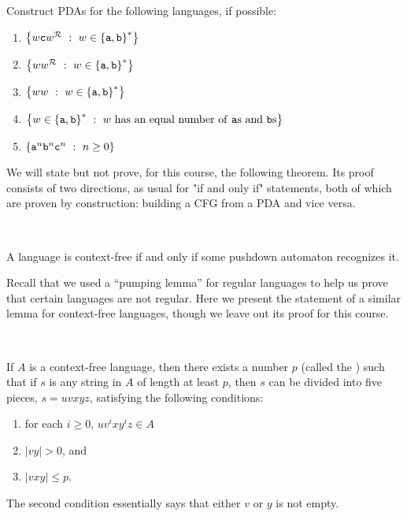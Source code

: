 \documentclass[twoside,letterpaper,openany]{book}
\begin{document}
\begin{exer}
Construct PDAs for the following languages, if possible:
\begin{enumerate}
\item $\left\lbrace w\texttt{c}w^{\mathcal{R}}\ :\  w \in \left\lbrace \texttt{a}, \texttt{b} \right\rbrace^{*}  \right\rbrace$
\item $\left\lbrace ww^{\mathcal{R}}\ :\  w \in \left\lbrace \texttt{a}, \texttt{b} \right\rbrace^{*}  \right\rbrace$
\item $\left\lbrace w{w}\ :\  w \in \left\lbrace \texttt{a}, \texttt{b} \right\rbrace^{*}  \right\rbrace$
\item $\left\lbrace w \in \left\lbrace {\texttt{a}}, {\texttt{b}} \right\rbrace^{*}\ :\ w~\textrm{has an equal number of {\texttt{a}}{s} and {\texttt{b}}{s}} \right\rbrace$
\item $\left\lbrace \texttt{a}^n \texttt{b}^n \texttt{c}^n\ :\  n \geq 0  \right\rbrace$
\end{enumerate}
\end{exer}

\begin{discussion}
We will state but not prove, for this course, the following theorem. Its proof consists of two directions, as usual for "if and only if" statements, both of which are proven by construction: building a CFG from a PDA and vice versa.
\end{discussion}

~

\begin{axiom}
A language is context-free if and only if some pushdown automaton recognizes it.
\end{axiom}

\begin{discussion}
Recall that we used a ``pumping lemma'' for regular languages to help us prove that certain languages are not regular. Here we present the statement of a similar lemma for context-free languages, though we leave out its proof for this course.
\end{discussion}

~

\begin{axiom}
If $A$ is a context-free language, then there exists a number $p$ (called the ) such that if $s$ is any string in $A$ of length at least $p$, then $s$ can be divided into five pieces, $s = uvxyz$, satisfying the following conditions:
\begin{enumerate}
\item for each $i \geq 0$, $uv^ixy^iz \in A$
\item $|vy| > 0$, and
\item $|vxy| \leq p$.
\end{enumerate}
The second condition essentially says that either $v$ or $y$ is not empty.
\end{axiom}
\end{document}
